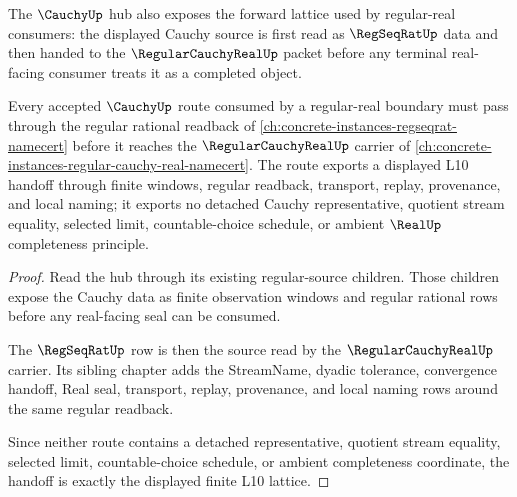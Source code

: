 The $\CauchyUp$ hub also exposes the forward lattice used by regular-real consumers: the displayed Cauchy source is first read as $\RegSeqRatUp$ data and then handed to the $\RegularCauchyRealUp$ packet before any terminal real-facing consumer treats it as a completed object.

\begin{theorem}
\label{thm:cauchy-regseqrat-sibling-route}
Every accepted $\CauchyUp$ route consumed by a regular-real boundary must pass through the regular rational readback of \autoref{ch:concrete-instances-regseqrat-namecert} before it reaches the $\RegularCauchyRealUp$ carrier of \autoref{ch:concrete-instances-regular-cauchy-real-namecert}. The route exports a displayed L10 handoff through finite windows, regular readback, transport, replay, provenance, and local naming; it exports no detached Cauchy representative, quotient stream equality, selected limit, countable-choice schedule, or ambient $\RealUp$ completeness principle.
\end{theorem}
\begin{proof}
Read the hub through its existing regular-source children. Those children expose the Cauchy data as finite observation windows and regular rational rows before any real-facing seal can be consumed.

The $\RegSeqRatUp$ row is then the source read by the $\RegularCauchyRealUp$ carrier. Its sibling chapter adds the StreamName, dyadic tolerance, convergence handoff, Real seal, transport, replay, provenance, and local naming rows around the same regular readback.

Since neither route contains a detached representative, quotient stream equality, selected limit, countable-choice schedule, or ambient completeness coordinate, the handoff is exactly the displayed finite L10 lattice.
\end{proof}

